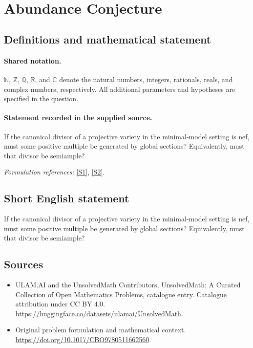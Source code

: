 \documentclass[11pt]{article}
\newcommand{\sref}[2]{\hyperlink{source:#1:#2}{[S#2]}}
\begin{document}
\section{Abundance Conjecture}\label{statement}

\subsection{Definitions and mathematical statement}

\paragraph{Shared notation.}$\mathbb N$, $\mathbb Z$, $\mathbb Q$, $\mathbb R$, and $\mathbb C$ denote the natural numbers, integers, rationals, reals, and complex numbers, respectively. All additional parameters and hypotheses are specified in the question.


\paragraph{Statement recorded in the supplied source.}
If the canonical divisor of a projective variety in the minimal-model setting is nef, must some positive multiple be generated by global sections? Equivalently, must that divisor be semiample?
\par\smallskip\textit{Formulation references:} \sref{statement}{1}, \sref{statement}{2}.
\subsection{Short English statement}
If the canonical divisor of a projective variety in the minimal-model setting is nef, must some positive multiple be generated by global sections? Equivalently, must that divisor be semiample?
\subsection{Sources}
\begin{itemize}
\item[\hypertarget{source:statement:1}{S1}] ULAM.AI and the UnsolvedMath Contributors, UnsolvedMath: A Curated Collection of Open Mathematics Problems, catalogue entry. Catalogue attribution under CC BY 4.0.
\url{https://huggingface.co/datasets/ulamai/UnsolvedMath}.
\item[\hypertarget{source:statement:2}{S2}] Original problem formulation and mathematical context.
\url{https://doi.org/10.1017/CBO9780511662560}.
\end{itemize}
\label{end:statement}
\end{document}
